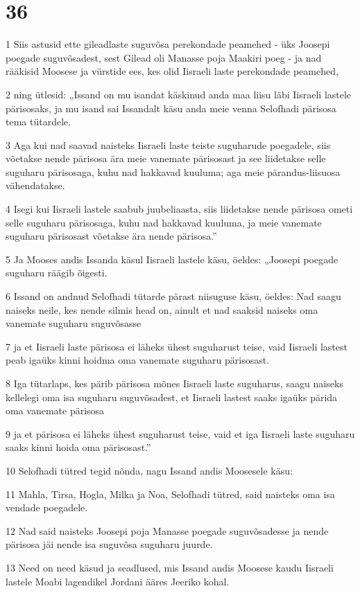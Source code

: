 \chapter{36}

\par 1 Siis astusid ette gileadlaste suguvõsa perekondade peamehed - üks Joosepi poegade suguvõsadest, sest Gilead oli Manasse poja Maakiri poeg - ja nad rääkisid Moosese ja vürstide ees, kes olid Iisraeli laste perekondade peamehed,
\par 2 ning ütlesid: „Issand on mu isandat käskinud anda maa liisu läbi Iisraeli lastele pärisosaks, ja mu isand sai Issandalt käsu anda meie venna Selofhadi pärisosa tema tütardele.
\par 3 Aga kui nad saavad naisteks Iisraeli laste teiste suguharude poegadele, siis võetakse nende pärisosa ära meie vanemate pärisosast ja see liidetakse selle suguharu pärisosaga, kuhu nad hakkavad kuuluma; aga meie pärandus-liisuosa vähendatakse.
\par 4 Isegi kui Iisraeli lastele saabub juubeliaasta, siis liidetakse nende pärisosa ometi selle suguharu pärisosaga, kuhu nad hakkavad kuuluma, ja meie vanemate suguharu pärisosast võetakse ära nende pärisosa.”
\par 5 Ja Mooses andis Issanda käsul Iisraeli lastele käsu, öeldes: „Joosepi poegade suguharu räägib õigesti.
\par 6 Issand on andnud Selofhadi tütarde pärast niisuguse käsu, öeldes: Nad saagu naiseks neile, kes nende silmis head on, ainult et nad saaksid naiseks oma vanemate suguharu suguvõsasse
\par 7 ja et Iisraeli laste pärisosa ei läheks ühest suguharust teise, vaid Iisraeli lastest peab igaüks kinni hoidma oma vanemate suguharu pärisosast.
\par 8 Iga tütarlaps, kes pärib pärisosa mõnes Iisraeli laste suguharus, saagu naiseks kellelegi oma isa suguharu suguvõsadest, et Iisraeli lastest saaks igaüks pärida oma vanemate pärisosa
\par 9 ja et pärisosa ei läheks ühest suguharust teise, vaid et iga Iisraeli laste suguharu saaks kinni hoida oma pärisosast.”
\par 10 Selofhadi tütred tegid nõnda, nagu Issand andis Moosesele käsu:
\par 11 Mahla, Tirsa, Hogla, Milka ja Noa, Selofhadi tütred, said naisteks oma isa vendade poegadele.
\par 12 Nad said naisteks Joosepi poja Manasse poegade suguvõsadesse ja nende pärisosa jäi nende isa suguvõsa suguharu juurde.
\par 13 Need on need käsud ja seadlused, mis Issand andis Moosese kaudu Iisraeli lastele Moabi lagendikel Jordani ääres Jeeriko kohal.

